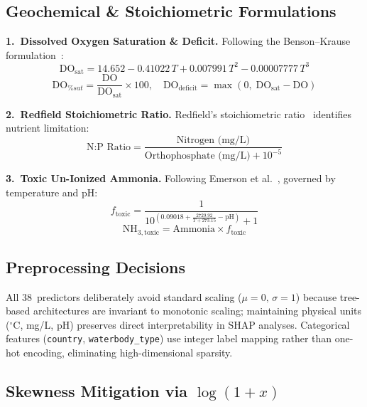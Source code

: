 \documentclass[conference]{IEEEtran}
\begin{document}
\subsection{Geochemical \& Stoichiometric Formulations}

\noindent\textbf{1.\ Dissolved Oxygen Saturation \& Deficit.}
Following the Benson--Krause formulation~\cite{benson1984concentration}:
\begin{equation}
  \text{DO}_{\text{sat}} =
    14.652 - 0.41022\,T + 0.007991\,T^2 - 0.00007777\,T^3
\end{equation}
\begin{equation}
  \text{DO}_{\%sat} = \frac{\text{DO}}{\text{DO}_{\text{sat}}} \times 100,
  \quad
  \text{DO}_{\text{deficit}} = \max(0,\;\text{DO}_{\text{sat}} - \text{DO})
\end{equation}

\noindent\textbf{2.\ Redfield Stoichiometric Ratio.}
Redfield's stoichiometric ratio~\cite{redfield1934proportions} identifies nutrient
limitation:
\begin{equation}
  \text{N:P Ratio} =
    \frac{\text{Nitrogen (mg/L)}}{\text{Orthophosphate (mg/L)} + 10^{-5}}
\end{equation}

\noindent\textbf{3.\ Toxic Un-Ionized Ammonia.}
Following Emerson et al.~\cite{emerson1975aqueous}, governed by temperature and pH:
\begin{equation}
  f_{\text{toxic}} =
    \frac{1}{10^{\left(0.09018 + \frac{2729.92}{T+273.15} - \text{pH}\right)} + 1}
\end{equation}
\begin{equation}
  \text{NH}_{3,\text{toxic}} = \text{Ammonia} \times f_{\text{toxic}}
\end{equation}

\subsection{Preprocessing Decisions}

All 38~predictors deliberately avoid standard scaling
($\mu{=}0,\,\sigma{=}1$) because tree-based architectures are invariant
to monotonic scaling; maintaining physical units ($^{\circ}$C, mg/L, pH)
preserves direct interpretability in SHAP analyses. Categorical features
(\texttt{country}, \texttt{waterbody\_type}) use integer label mapping
rather than one-hot encoding, eliminating high-dimensional sparsity.

\subsection{Skewness Mitigation via $\log(1+x)$}
\end{document}
